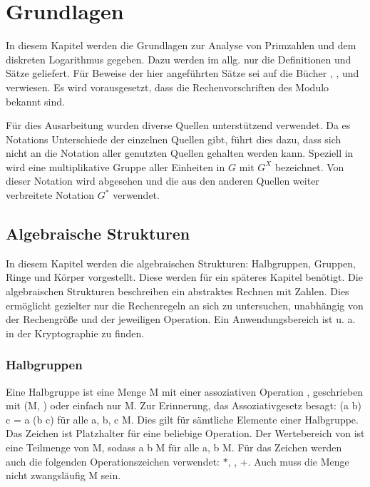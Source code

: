 \section{Grundlagen}\label{Kapitel Grundlagen}
	In diesem Kapitel werden die Grundlagen zur Analyse von Primzahlen und dem diskreten Logarithmus gegeben. Dazu werden im allg. nur die Definitionen und Sätze geliefert. Für Beweise der hier angeführten Sätze sei auf die Bücher \cite{Kryptografie:in:Theorie:und:Praxis}, \cite{Erste:Hilfe:in:Linearer:Algebra}, \cite{Kryptographie:und:IT-Sicherheit} und \cite{Information:und:Kommunikation}
	verwiesen. Es wird vorausgesetzt, dass die Rechenvorschriften des Modulo bekannt sind.
	
	Für dies Ausarbeitung wurden diverse Quellen unterstützend verwendet. Da es Notations Unterschiede der einzelnen Quellen gibt, führt dies dazu, dass sich nicht an die Notation aller genutzten Quellen gehalten werden kann. Speziell in \cite{Erste:Hilfe:in:Linearer:Algebra} wird eine multiplikative Gruppe aller Einheiten in $G$ mit $G^X$ bezeichnet. Von dieser Notation wird abgesehen und die aus den anderen Quellen weiter verbreitete Notation $G^*$ verwendet.
	
	\subsection{Algebraische Strukturen}
		In diesem Kapitel werden die algebraischen Strukturen: Halbgruppen, Gruppen, Ringe und Körper vorgestellt. Diese werden für ein späteres Kapitel benötigt. Die algebraischen Strukturen beschreiben ein abstraktes Rechnen mit Zahlen. Dies ermöglicht gezielter nur die Rechenregeln an sich zu untersuchen, unabhängig von der Rechengröße und der jeweiligen Operation. Ein Anwendungsbereich ist u. a. in der Kryptographie zu finden.~\cite{Kryptographie:und:Algorithmen}
	
		\subsubsection{Halbgruppen}
			Eine Halbgruppe ist eine Menge M mit einer assoziativen Operation \mycircOhne, geschrieben mit (M, \mycircOhne) oder einfach nur M. Zur Erinnerung, das Assoziativgesetz besagt: (a \mycirc b) \mycirc c = a \mycirc (b \mycirc c) für alle a, b, c \myin M. Dies gilt für sämtliche Elemente einer Halbgruppe. Das Zeichen \mycirc ist Platzhalter für eine beliebige Operation. Der Wertebereich von \mycirc ist eine Teilmenge von M, sodass a \mycirc b \myin M für alle a, b \myin M. Für das Zeichen \mycirc werden auch die folgenden Operationszeichen verwendet: $*$, \mycdotOhne, +. Auch muss die Menge nicht zwangsläufig M sein.~\cite{Erste:Hilfe:in:Linearer:Algebra}
			
